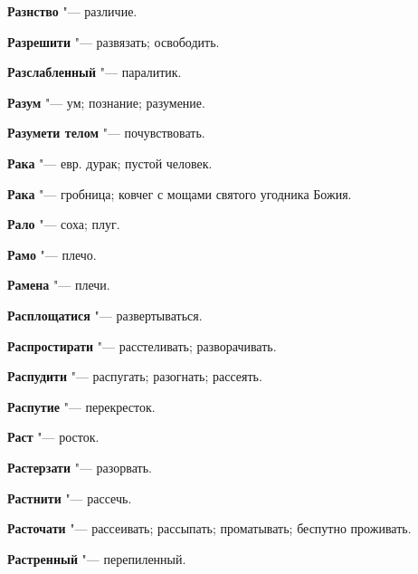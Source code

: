 \begin{mymulticols}{2}
\noindent\textbf{Разнство} "--- различие. 




\noindent\textbf{Разрешити} "--- развязать; освободить. 




\noindent\textbf{Разслабленный} "--- паралитик. 




\noindent\textbf{Разум} "--- ум; познание; разумение. 




\noindent\textbf{Разумети телом} "--- почувствовать. 




\noindent\textbf{Рака} "--- евр. дурак; пустой человек. 




\noindent\textbf{Рака} "--- гробница; ковчег с мощами святого угодника Божия. 




\noindent\textbf{Рало} "--- соха; плуг. 




\noindent\textbf{Рамо} "--- плечо. 




\noindent\textbf{Рамена} "--- плечи. 




\noindent\textbf{Расплощатися} "--- развертываться. 




\noindent\textbf{Распростирати} "--- расстеливать; разворачивать. 




\noindent\textbf{Распудити} "--- распугать; разогнать; рассеять. 




\noindent\textbf{Распутие} "--- перекресток. 




\noindent\textbf{Раст} "--- росток. 




\noindent\textbf{Растерзати} "--- разорвать. 




\noindent\textbf{Растнити} "--- рассечь. 




\noindent\textbf{Расточати} "--- рассеивать; рассыпать; проматывать; беспутно проживать. 




\noindent\textbf{Растренный} "--- перепиленный. 





\end{mymulticols}
